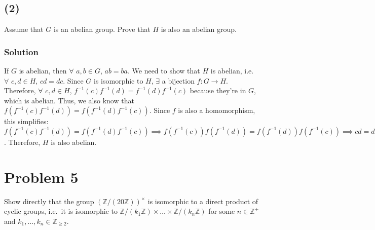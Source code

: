 \documentclass[fleqn]{article}
\begin{document}
        \subsection{(2)}
        Assume that $G$ is an abelian group.  Prove that $H$ is also an abelian group.
            
            \subsubsection{Solution}
            If $G$ is abelian, then $\forall$ $a, b \in G$, $ab = ba$.  We need to show that $H$ is abelian, i.e.\ $\forall$ $c, d \in H$, $cd = dc$.  Since $G$ is isomorphic to $H$, $\exists$ a bijection $f: G \to H$.  Therefore, $\forall$ $c, d \in H$, $f^{-1}(c)f^{-1}(d) = f^{-1}(d)f^{-1}(c)$ because they're in $G$, which is abelian.  Thus, we also know that $f(f^{-1}(c)f^{-1}(d)) = f(f^{-1}(d)f^{-1}(c))$.  Since $f$ is also a homomorphism, this simplifies: $f(f^{-1}(c)f^{-1}(d)) = f(f^{-1}(d)f^{-1}(c)) \implies f(f^{-1}(c))f(f^{-1}(d)) = f(f^{-1}(d))f(f^{-1}(c)) \implies cd = dc$.  Therefore, $H$ is also abelian.
        
    \section{Problem 5}
    Show directly that the group $(\mathbb{Z}/(20\mathbb{Z}))^{\times}$ is isomorphic to a direct product of cyclic groups, i.e.\ it is isomorphic to $\mathbb{Z}/(k_1 \mathbb{Z}) \times \dots \times \mathbb{Z}/(k_n \mathbb{Z})$ for some $n \in \mathbb{Z}^+$ and $k_1, \dots, k_n \in \mathbb{Z}_{\geq 2}$.
        
\end{document}
